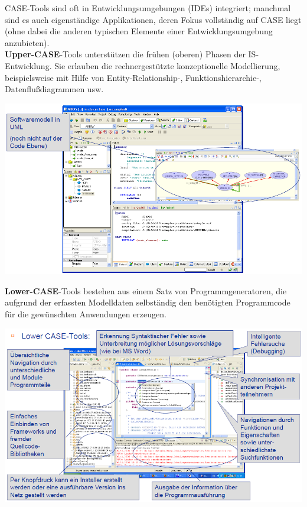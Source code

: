 \documentclass[10pt,a4paper,fleqn]{article}
\begin{document}
\begin{enumerate}
		CASE-Tools sind oft in Entwicklungsumgebungen (IDEs) integriert; manchmal sind es auch eigenständige Applikationen, deren Fokus vollständig auf CASE liegt (ohne dabei die anderen typischen Elemente einer Entwicklungsumgebung anzubieten).\\
\newpage
		\textbf{Upper-CASE}-Tools unterstützen die frühen (oberen) Phasen der IS-Entwicklung. Sie erlauben die rechnergestützte konzeptionelle Modellierung, beispielsweise mit Hilfe von Entity-Relationship-, \mbox{Funktionshierarchie-,} Datenflußdiagrammen usw.\\
		\begin{center}
			\includegraphics[scale=0.45]{UpperCASE.png}
		\end{center}				
		\textbf{Lower-CASE}-Tools bestehen aus einem Satz von Programmgeneratoren, die aufgrund der erfassten Modelldaten selbständig den benötigten Programmcode für die gewünschten Anwendungen erzeugen.\\
		\begin{center}
			\includegraphics[scale=0.45]{LowerCASE.png}
		\end{center}		
\end{enumerate}
\end{document}

